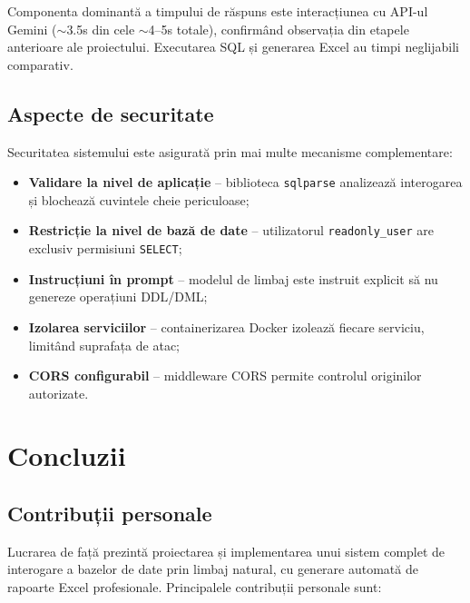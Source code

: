 \documentclass[12pt, a4paper]{report}
\newcommand{\code}[1]{\texttt{#1}}
\begin{document}
Componenta dominantă a timpului de răspuns este interacțiunea cu API-ul Gemini ($\sim$3.5s din cele $\sim$4--5s totale), confirmând observația din etapele anterioare ale proiectului. Executarea SQL și generarea Excel au timpi neglijabili comparativ.

\section{Aspecte de securitate}

Securitatea sistemului este asigurată prin mai multe mecanisme complementare:

\begin{itemize}[nosep]
  \item \textbf{Validare la nivel de aplicație} -- biblioteca \code{sqlparse} analizează interogarea și blochează cuvintele cheie periculoase;
  \item \textbf{Restricție la nivel de bază de date} -- utilizatorul \code{readonly\_user} are exclusiv permisiuni \code{SELECT};
  \item \textbf{Instrucțiuni în prompt} -- modelul de limbaj este instruit explicit să nu genereze operațiuni DDL/DML;
  \item \textbf{Izolarea serviciilor} -- containerizarea Docker izolează fiecare serviciu, limitând suprafața de atac;
  \item \textbf{CORS configurabil} -- middleware CORS permite controlul originilor autorizate.
\end{itemize}


\chapter{Concluzii}

\section{Contribuții personale}

Lucrarea de față prezintă proiectarea și implementarea unui sistem complet de interogare a bazelor de date prin limbaj natural, cu generare automată de rapoarte Excel profesionale. Principalele contribuții personale sunt:
\end{document}
